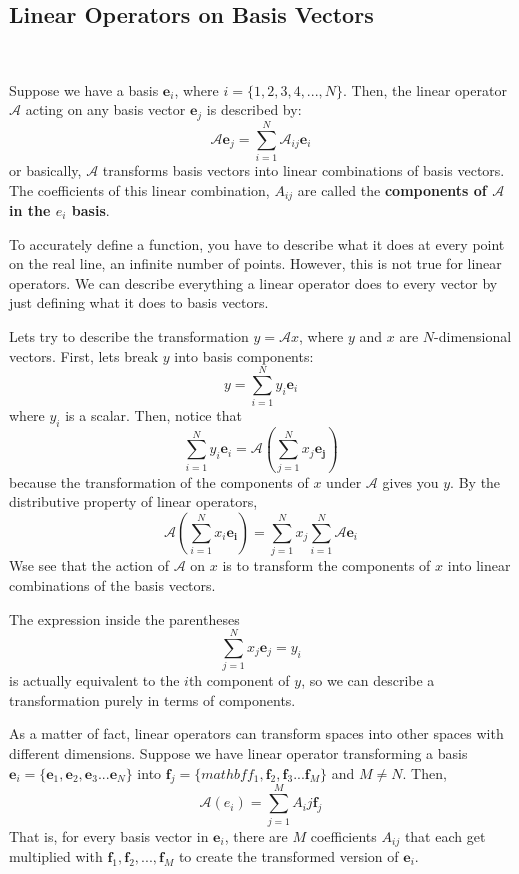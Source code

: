 \documentclass{article}
\begin{document}
\subsection{Linear Operators on Basis Vectors}
\
\begin{proposition}
Suppose we have a basis $\mathbf{e}_i$, where $i = \{1,2,3,4,...,N\}$. Then, the linear operator $\mathcal{A}$ acting on any basis vector $\mathbf{e}_j$ is described by:$$ \mathcal{A} \mathbf{e}_j = \sum_{i=1}^{N} \mathcal{A}_{ij}\mathbf{e}_i$$or basically, $\mathcal{A}$ transforms basis vectors into linear combinations of basis vectors. The coefficients of this linear combination, $A_{ij}$ are called the \textbf{components of $\mathcal{A}$ in the $e_i$ basis}. 
\end{proposition}

To accurately define a function, you have to describe what it does at every point on the real line, an infinite number of points. However, this is not true for linear operators. We can describe everything a linear operator does to every vector by just defining what it does to basis vectors.

\begin{proposition}
Lets try to describe the transformation $y = \mathcal{A}x$, where $y$ and $x$ are $N$-dimensional vectors. First, lets break $y$ into basis components: $$y = \sum_{i=1}^{N} y_i \mathbf{e}_i$$where $y_i$ is a scalar. Then, notice that $$\sum_{i=1}^{N} y_i \mathbf{e}_i = \mathcal{A}(\sum_{j=1}^{N}x_j\mathbf{e_j})$$because the transformation of the components of $x$ under $\mathcal{A}$ gives you $y$. By the distributive property of linear operators, $$\mathcal{A}(\sum_{i=1}^{N}x_i\mathbf{e_i}) =\sum_{j=1}^{N}x_j\sum_{i=1}^{N}\mathcal{A}\mathbf{e}_i$$Wse see that the action of $\mathcal{A}$ on $x$ is to transform the components of $x$ into linear combinations of the basis vectors. 
\end{proposition}

The expression inside the parentheses$$\sum_{j=1}^{N}x_j\mathbf{e}_j = y_i$$ is actually equivalent to the $i$th component of $y$, so we can describe a transformation purely in terms of components.

As a matter of fact, linear operators can transform spaces into other spaces with different dimensions. Suppose we have linear operator transforming a basis $\mathbf{e}_i = \{\mathbf{e}_1, \mathbf{e}_2, \mathbf{e}_3 ... \mathbf{e}_N\}$ into $\mathbf{f}_j = \{mathbf{f}_1, \mathbf{f}_2, \mathbf{f}_3 ... \mathbf{f}_M\}$ and $M \neq N$. Then, $$\mathcal{A}(e_i) = \sum_{j=1}^{M} A_ij \mathbf{f}_j$$That is, for every basis vector in $\mathbf{e}_i$, there are $M$ coefficients $A_{ij}$ that each get multiplied with $\mathbf{f}_1, \mathbf{f}_2, ..., \mathbf{f}_M$ to create the transformed version of $\mathbf{e}_i$. 
\end{document}
